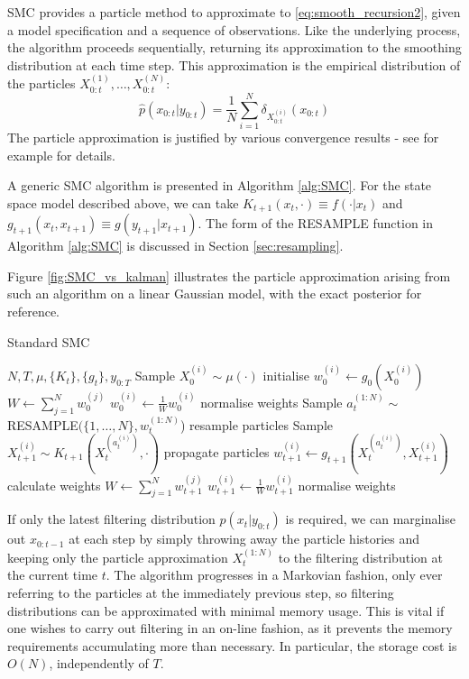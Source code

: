 \documentclass[fleqn]{article}
\theoremstyle{definition}
\newcommand{\wt}[2][t]{w_{#1}^{(#2)}}
\begin{document}
SMC provides a particle method to approximate to \eqref{eq:smooth_recursion2}, given a model specification and a sequence of observations. Like the underlying process, the algorithm proceeds sequentially, returning its approximation to the smoothing distribution at each time step.
This approximation is the empirical distribution of the particles $X_{0:t}^{(1)}, \dots, X_{0:t}^{(N)}$:
\begin{equation}
\hat{p}(x_{0:t}|y_{0:t}) = \frac{1}{N} \sum_{i=1}^N \delta_{X_{0:t}^{(i)}} (x_{0:t})
\end{equation}
The particle approximation is justified by various convergence results - see for example \citet{delmoral2013} for details.

A generic SMC algorithm is presented in Algorithm \ref{alg:SMC}. For the state space model described above, we can take $K_{t+1}(x_t, \cdot) \equiv f(\cdot | x_t)$ and $g_{t+1}(x_t, x_{t+1}) \equiv g(y_{t+1} | x_{t+1})$.
The form of the {\footnotesize RESAMPLE} function in Algorithm \ref{alg:SMC} is discussed in Section \ref{sec:resampling}.

Figure \ref{fig:SMC_vs_kalman} illustrates the particle approximation arising from such an algorithm on a linear Gaussian model, with the exact posterior for reference.

\begin{algorithm}
\caption{Standard SMC}\label{alg:SMC}
\begin{algorithmic}[1]
\Require $N, T, \mu, \{K_t\}, \{g_t\}, y_{0:T}$
	\State Sample $X_0^{(i)} \sim \mu(\cdot)$  \Comment initialise
	\State $w_0^{(i)} \gets g_0(X_0^{(i)})$
\EndFor
\State $W \gets \sum_{j=1}^N w_{0}^{(j)}$
		\State $w_{0}^{(i)} \gets \frac{1}{W}w_{0}^{(i)}$ \Comment normalise weights
	\EndFor
{}
	\State Sample $a_t^{(1:N)} \sim $ {\footnotesize RESAMPLE}$(\{1,\dots ,N\}, \wt{1:N}$) \Comment resample particles
		\State Sample $X_{t+1}^{(i)} \sim K_{t+1}(X_t^{(a_t^{(i)})}, \cdot)$ \Comment propagate particles
		\State $w_{t+1}^{(i)} \gets g_{t+1}(X_t^{(a_t^{(i)})} , X_{t+1}^{(i)})$ \Comment calculate weights
	\EndFor
	\State $W \gets \sum_{j=1}^N w_{t+1}^{(j)}$
		\State $w_{t+1}^{(i)} \gets \frac{1}{W}w_{t+1}^{(i)}$ \Comment normalise weights
	\EndFor
\EndFor
\end{algorithmic}
\end{algorithm}

If only the latest filtering distribution $p(x_t | y_{0:t})$ is required, we can marginalise out $x_{0:t-1}$ at each step by simply throwing away the particle histories and keeping only the particle approximation $X_{t}^{(1:N)}$ to the filtering distribution at the current time $t$. 
The algorithm progresses in a Markovian fashion, only ever referring to the particles at the immediately previous step, so filtering distributions can be approximated with minimal memory usage. 
This is vital if one wishes to carry out filtering in an on-line fashion, as it prevents the memory requirements accumulating more than necessary. In particular, the storage cost is $O(N)$, independently of $T$.
\end{document}
